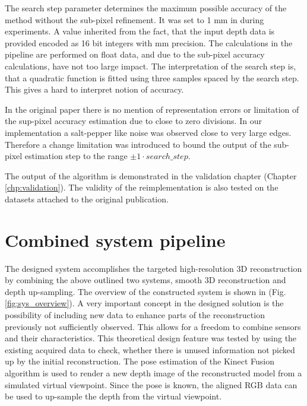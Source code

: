\documentclass{ucl_thesis}
\newcommand{\figref}[1]{(Fig. \ref{#1})}
\newcommand{\chpref}[1]{(Chapter \ref{#1})}
\begin{document}
\par The search step parameter determines the maximum possible accuracy of the method without the sub-pixel refinement. It was set to 1 mm in during experiments. A value inherited from the fact, that the input depth data is provided encoded as 16 bit integers with mm precision. The calculations in the pipeline are performed on float data, and due to the sub-pixel accuracy calculations, have not too large impact. The interpretation of the search step is, that a quadratic function is fitted using three samples spaced by the search step. This gives a hard to interpret notion of accuracy.

\par In the original paper there is no mention of representation errors or limitation of the sup-pixel accuracy estimation due to close to zero divisions. In our implementation a salt-pepper like noise was observed close to very large edges. Therefore a change limitation was introduced to bound the output of the sub-pixel estimation step to the range $\pm 1 \cdot search\_step$.

\par The output of the algorithm is demonstrated in the validation chapter \chpref{chp:validation}. The validity of the reimplementation is also tested on the datasets attached to the original publication.
        
\section{Combined system pipeline}
\label{sec:combined}

\par The designed system accomplishes the targeted high-resolution 3D reconstruction by combining the above outlined two systems, smooth 3D reconstruction and depth up-sampling. The overview of the constructed system is shown in \figref{fig:sys_overview}. A very important concept in the designed solution is the possibility of including new data to enhance parts of the reconstruction previously not sufficiently observed. This allows for a freedom to combine sensors and their characteristics. This theoretical design feature was tested by using the existing acquired data to check, whether there is unused information not picked up by the initial reconstruction. The pose estimation of the Kinect Fusion algorithm is used to render a new depth image of the reconstructed model from a simulated virtual viewpoint. Since the pose is known, the aligned RGB data can be used to up-sample the depth from the virtual viewpoint.
\end{document}
